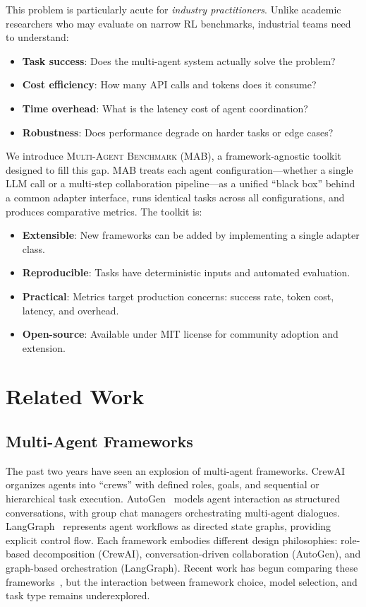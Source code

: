 \documentclass[sigconf,nonacm]{acmart}
\begin{document}
This problem is particularly acute for \emph{industry practitioners}. Unlike academic researchers who may evaluate on narrow RL benchmarks, industrial teams need to understand:
\begin{itemize}
    \item \textbf{Task success}: Does the multi-agent system actually solve the problem?
    \item \textbf{Cost efficiency}: How many API calls and tokens does it consume?
    \item \textbf{Time overhead}: What is the latency cost of agent coordination?
    \item \textbf{Robustness}: Does performance degrade on harder tasks or edge cases?
\end{itemize}

We introduce \textsc{Multi-Agent Benchmark} (MAB), a framework-agnostic toolkit designed to fill this gap. MAB treats each agent configuration—whether a single LLM call or a multi-step collaboration pipeline—as a unified ``black box'' behind a common adapter interface, runs identical tasks across all configurations, and produces comparative metrics. The toolkit is:
\begin{itemize}
    \item \textbf{Extensible}: New frameworks can be added by implementing a single adapter class.
    \item \textbf{Reproducible}: Tasks have deterministic inputs and automated evaluation.
    \item \textbf{Practical}: Metrics target production concerns: success rate, token cost, latency, and overhead.
    \item \textbf{Open-source}: Available under MIT license for community adoption and extension.
\end{itemize}

\section{Related Work}

\subsection{Multi-Agent Frameworks}

The past two years have seen an explosion of multi-agent frameworks. CrewAI~\cite{crewai2024} organizes agents into ``crews'' with defined roles, goals, and sequential or hierarchical task execution. AutoGen~\cite{wu2023autogen} models agent interaction as structured conversations, with group chat managers orchestrating multi-agent dialogues. LangGraph~\cite{langgraph2024} represents agent workflows as directed state graphs, providing explicit control flow. Each framework embodies different design philosophies: role-based decomposition (CrewAI), conversation-driven collaboration (AutoGen), and graph-based orchestration (LangGraph). Recent work has begun comparing these frameworks~\cite{mafbench2026,benchagent2026}, but the interaction between framework choice, model selection, and task type remains underexplored.
\end{document}
